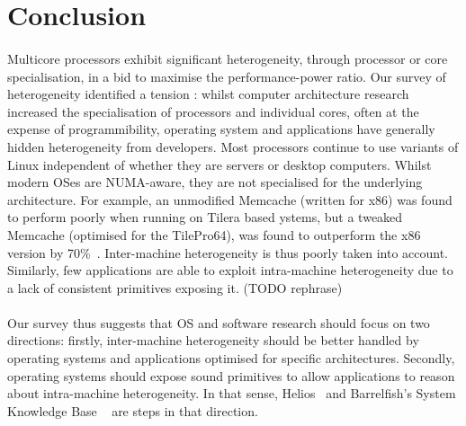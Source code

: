 \section{Conclusion}

\paragraph{}Multicore processors exhibit significant heterogeneity, through processor or core specialisation, in a bid
to maximise the performance-power ratio. Our 
survey of heterogeneity identified a tension :
whilst computer architecture research increased
the specialisation of processors and individual cores,
often at the expense of programmibility, 
operating system and applications have generally 
hidden heterogeneity from developers. Most processors 
continue to use variants of Linux independent of
whether they are servers or desktop computers. 
Whilst modern OSes are NUMA-aware, they are not specialised for the underlying architecture.
For example, an unmodified Memcache (written for x86) was found to perform poorly when 
running on Tilera based ystems, but a tweaked Memcache (optimised for the TilePro64), 
was found to outperform the x86 version by 70\%~\cite{berezecki2011manycore}.
Inter-machine heterogeneity is thus poorly taken into account. Similarly, 
few applications are able to exploit intra-machine
heterogeneity due to a lack of consistent primitives exposing it. (TODO rephrase)


\paragraph{} Our survey thus suggests that OS and software research should focus on two directions:
firstly, inter-machine heterogeneity should be better handled by operating systems
and applications optimised for specific architectures. Secondly, operating 
systems should expose sound primitives to allow applications to reason about 
intra-machine heterogeneity. In that sense, Helios~\cite{nightingale2009helios}
 and Barrelfish's System Knowledge Base ~\cite{schupbach08embracingdiversity} are 
steps in that direction. 


